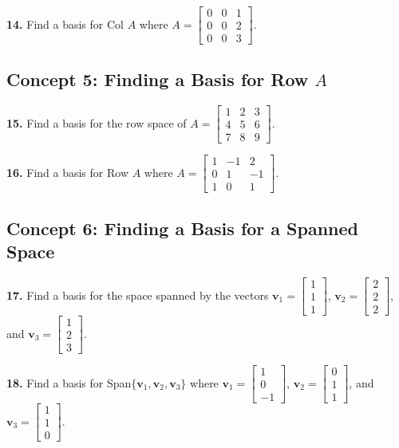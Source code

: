 \documentclass[11pt]{article}
\begin{document}
\vspace{0.5cm}
\textbf{14.} Find a basis for Col $A$ where $A = \begin{bmatrix} 0 & 0 & 1 \\ 0 & 0 & 2 \\ 0 & 0 & 3 \end{bmatrix}$.

\subsection*{Concept 5: Finding a Basis for Row $A$}
\textbf{15.} Find a basis for the row space of $A = \begin{bmatrix} 1 & 2 & 3 \\ 4 & 5 & 6 \\ 7 & 8 & 9 \end{bmatrix}$.

\vspace{0.5cm}
\textbf{16.} Find a basis for Row $A$ where $A = \begin{bmatrix} 1 & -1 & 2 \\ 0 & 1 & -1 \\ 1 & 0 & 1 \end{bmatrix}$.

\subsection*{Concept 6: Finding a Basis for a Spanned Space}
\textbf{17.} Find a basis for the space spanned by the vectors $\mathbf{v}_1 = \begin{bmatrix} 1 \\ 1 \\ 1 \end{bmatrix}$, $\mathbf{v}_2 = \begin{bmatrix} 2 \\ 2 \\ 2 \end{bmatrix}$, and $\mathbf{v}_3 = \begin{bmatrix} 1 \\ 2 \\ 3 \end{bmatrix}$.

\vspace{0.5cm}
\textbf{18.} Find a basis for Span$\{\mathbf{v}_1, \mathbf{v}_2, \mathbf{v}_3\}$ where $\mathbf{v}_1 = \begin{bmatrix} 1 \\ 0 \\ -1 \end{bmatrix}$, $\mathbf{v}_2 = \begin{bmatrix} 0 \\ 1 \\ 1 \end{bmatrix}$, and $\mathbf{v}_3 = \begin{bmatrix} 1 \\ 1 \\ 0 \end{bmatrix}$.
\end{document}
